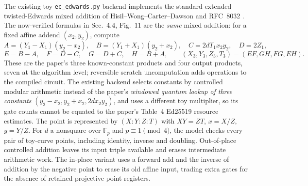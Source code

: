 \documentclass[11pt]{article}
\newcommand{\code}[1]{\texttt{#1}}
\theoremstyle{plain}
\theoremstyle{remark}
\begin{document}
The existing toy \code{ec\_edwards.py} backend implements the standard
extended twisted-Edwards mixed addition of Hisil--Wong--Carter--Dawson and
RFC~8032 \cite{ec:rfc8032}. The now-verified formulas in \cite{ec:kim26}
Sec.~4.4, Fig.~11 are the \emph{same} mixed addition: for a fixed affine
addend $(x_2,y_2)$, compute
\[
A=(Y_1-X_1)(y_2-x_2),\quad B=(Y_1+X_1)(y_2+x_2),\quad
C=2dT_1x_2y_2,\quad D=2Z_1,
\]
\[
E=B-A,\quad F=D-C,\quad G=D+C,\quad H=B+A,\qquad
(X_3,Y_3,Z_3,T_3)=(EF,GH,FG,EH).
\]
These are the paper's three known-constant products and four output products,
seven at the algorithm level; reversible scratch uncomputation adds operations
to the compiled circuit. The existing backend selects constants by controlled
modular arithmetic instead of the paper's \emph{windowed quantum lookup of
three constants} $(y_2-x_2,y_2+x_2,2dx_2y_2)$, and uses a different toy
multiplier, so its gate counts cannot be equated to the paper's Table~4
Ed25519 resource estimates. The point is represented by $(X:Y:Z:T)$ with
$XY=ZT$, $x=X/Z$, $y=Y/Z$. For $d$ a nonsquare over $\mathbb F_p$
and $p\equiv1\pmod4$, the model checks every pair of toy-curve points,
including identity, inverse and doubling. Out-of-place controlled addition
leaves its input triple available and erases intermediate arithmetic work.
The in-place variant uses a forward add and the inverse of addition by
the negative point to erase its old affine input, trading extra gates for
the absence of retained projective point registers.
\end{document}
